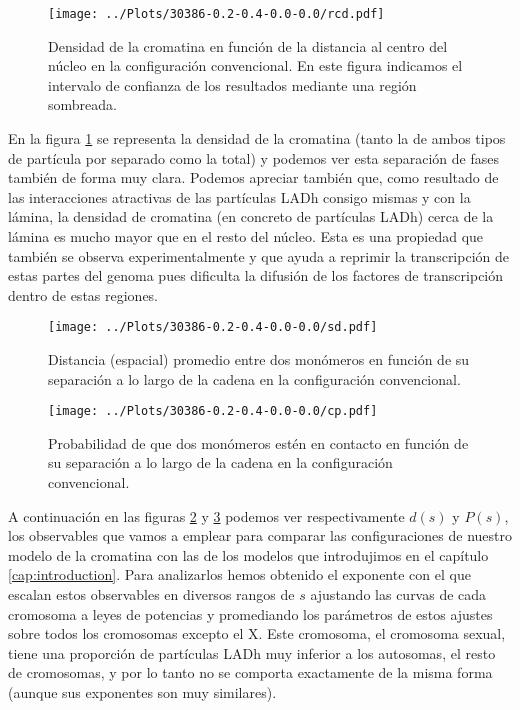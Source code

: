 \begin{figure}[t]
    \centering
    \texttt{[image: ../Plots/30386-0.2-0.4-0.0-0.0/rcd.pdf]}
    \caption{Densidad de la cromatina en función de la distancia al centro del núcleo en la configuración convencional. En este figura indicamos el intervalo de confianza de los resultados mediante una región sombreada.}
    \label{fig:rcd_c}
\end{figure}

En la figura \ref{fig:rcd_c} se representa la densidad de la cromatina (tanto la de ambos tipos de partícula por separado como la total) y podemos ver esta separación de fases también de forma muy clara. Podemos apreciar también que, como resultado de las interacciones atractivas de las partículas LADh consigo mismas y con la lámina, la densidad de cromatina (en concreto de partículas LADh) cerca de la lámina es mucho mayor que en el resto del núcleo. Esta es una propiedad que también se observa experimentalmente y que ayuda a reprimir la transcripción de estas partes del genoma pues dificulta la difusión de los factores de transcripción dentro de estas regiones.

\begin{figure}[p]
    \centering
    \texttt{[image: ../Plots/30386-0.2-0.4-0.0-0.0/sd.pdf]}
    \caption{Distancia (espacial) promedio entre dos monómeros en función de su separación a lo largo de la cadena en la configuración convencional.}
    \label{fig:sd_c}
\end{figure}

\begin{figure}[p]
    \centering
    \texttt{[image: ../Plots/30386-0.2-0.4-0.0-0.0/cp.pdf]}
    \caption{Probabilidad de que dos monómeros estén en contacto en función de su separación a lo largo de la cadena en la configuración convencional.}
    \label{fig:cp_c}
\end{figure}

A continuación en las figuras \ref{fig:sd_c} y \ref{fig:cp_c} podemos ver respectivamente $d(s)$ y $P(s)$, los observables que vamos a emplear para comparar las configuraciones de nuestro modelo de la cromatina con las de los modelos que introdujimos en el capítulo \ref{cap:introduction}. Para analizarlos hemos obtenido el exponente con el que escalan estos observables en diversos rangos de $s$ ajustando las curvas de cada cromosoma a leyes de potencias y promediando los parámetros de estos ajustes sobre todos los cromosomas excepto el X. Este cromosoma, el cromosoma sexual, tiene una proporción de partículas LADh muy inferior a los autosomas, el resto de cromosomas, y por lo tanto no se comporta exactamente de la misma forma (aunque sus exponentes son muy similares).

